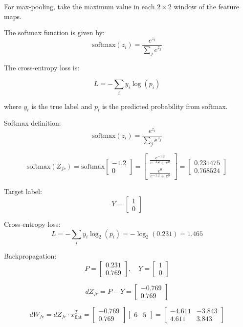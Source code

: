\documentclass[a4 paper]{article}
\begin{document}
For max-pooling, take the maximum value in each $2 \times 2$ window of the feature maps.\newline

The softmax function is given by:
\[
\text{softmax}(z_i) = \frac{e^{z_i}}{\sum_j e^{z_j}}
\]

The cross-entropy loss is:

\[
L = -\sum_{i} y_i \log(p_i)
\]

where $y_i$ is the true label and $p_i$ is the predicted probability from softmax.




Softmax definition:
\[
\text{softmax}(z_i) = \frac{e^{z_i}}{\sum_j e^{z_j}}
\]

\[
\text{softmax}(Z_{fc}) = \text{softmax}
\begin{bmatrix}
-1.2 \\ 0
\end{bmatrix}
=
\begin{bmatrix}
\frac{e^{-1.2}}{e^{-1.2} + e^0} \\
\frac{e^{0}}{e^{-1.2} + e^0}
\end{bmatrix}
=
\begin{bmatrix}
0.231475 \\ 0.768524
\end{bmatrix}
\]

Target label:
\[
Y = \begin{bmatrix} 1 \\ 0 \end{bmatrix}
\]

Cross-entropy loss:
\[
L = - \sum_i y_i \log_2(p_i) 
= - \log_2(0.231) 
= 1.465
\]

Backpropagation:
\[
P = \begin{bmatrix} 0.231 \\ 0.769 \end{bmatrix},
\quad Y = \begin{bmatrix} 1 \\ 0 \end{bmatrix}
\]

\[
dZ_{fc} = P - Y 
= \begin{bmatrix} -0.769 \\ 0.769 \end{bmatrix}
\]

\[
dW_{fc} = dZ_{fc} \cdot x_{\text{flat}}^T 
= 
\begin{bmatrix}
-0.769 \\ 0.769
\end{bmatrix}
\begin{bmatrix}
6 & 5
\end{bmatrix}
=
\begin{bmatrix}
-4.611 & -3.843 \\
4.611 & 3.843
\end{bmatrix}
\]
\end{document}
